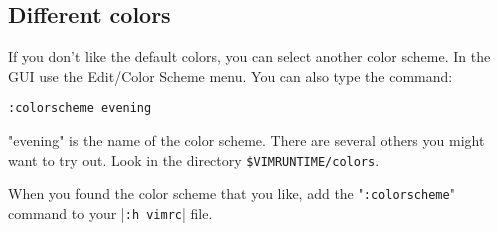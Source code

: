 \subsection{Different colors}
\label{syn-default-override}

If you don't like the default colors, you can select another color scheme.
In the GUI use the Edit/Color Scheme menu.
You can also type the command:

 \begin{Verbatim}[samepage=true]
 :colorscheme evening
 \end{Verbatim}

"evening" is the name of the color scheme.
There are several others you might want to try out.
Look in the directory \texttt{\$VIMRUNTIME/colors}.

When you found the color scheme that you like, add the "\texttt{:colorscheme}" command to your |\texttt{:h vimrc}| file.

